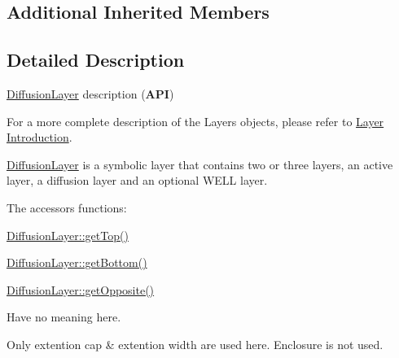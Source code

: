 \subsection*{Additional Inherited Members}


\subsection{Detailed Description}
\hyperlink{classHurricane_1_1DiffusionLayer}{Diffusion\-Layer} description ({\bfseries A\-P\-I}) 

For a more complete description of the Layers objects, please refer to \hyperlink{classHurricane_1_1Layer_secLayerIntro}{Layer Introduction}.

\hyperlink{classHurricane_1_1DiffusionLayer}{Diffusion\-Layer} is a symbolic layer that contains two or three layers, an active layer, a diffusion layer and an optional W\-E\-L\-L layer.

The accessors functions\-: 
\begin{DoxyItemize}
\item \hyperlink{classHurricane_1_1Layer_a00213c29884bfd396576c9cf2fb8ed59}{Diffusion\-Layer\-::get\-Top()} 
\item \hyperlink{classHurricane_1_1Layer_a5398b082b8a441c13d5b54c3cefff685}{Diffusion\-Layer\-::get\-Bottom()} 
\item \hyperlink{classHurricane_1_1Layer_a97d8901ab1e4598d0783aeb89f55421a}{Diffusion\-Layer\-::get\-Opposite()} 
\end{DoxyItemize}Have no meaning here.

Only extention cap \& extention width are used here. Enclosure is not used. 

